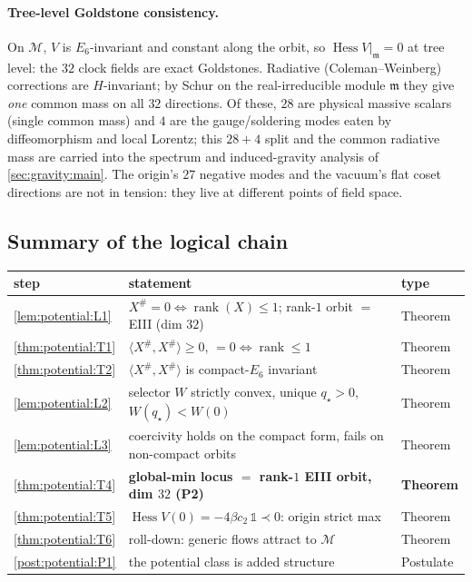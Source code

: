 \documentclass[11pt]{article}
\theoremstyle{plain}
\theoremstyle{definition}
\theoremstyle{remark}
\begin{document}
\paragraph{Tree-level Goldstone consistency.}
On $\mathcal M$, $V$ is $E_6$-invariant and constant along the orbit, so
$\operatorname{Hess}V|_{\mathfrak m}=0$ at tree level: the $32$ clock fields are exact
Goldstones. Radiative (Coleman--Weinberg) corrections are $H$-invariant; by Schur on the
real-irreducible module $\mathfrak m$ they give \emph{one} common mass on all $32$ directions.
Of these, $28$ are physical massive scalars (single common mass) and $4$ are the
gauge/soldering modes eaten by diffeomorphism and local Lorentz; this $28+4$ split and the
common radiative mass are carried into the spectrum and induced-gravity analysis of
\autoref{sec:gravity:main}. The origin's $27$ negative modes and the vacuum's flat coset
directions are not in tension: they live at different points of field space.

\subsection{Summary of the logical chain}
\label{sec:potential:summary}

\begin{center}
\begin{tabular}{lll}
\toprule
step & statement & type \\
\midrule
\autoref{lem:potential:L1} & $X^\#=0\iff\operatorname{rank}(X)\le1$; rank-$1$ orbit $=$ EIII (dim $32$) & Theorem \\
\autoref{thm:potential:T1} & $\langle X^\#,X^\#\rangle\ge0$, $=0\iff\operatorname{rank}\le1$ & Theorem \\
\autoref{thm:potential:T2} & $\langle X^\#,X^\#\rangle$ is compact-$E_6$ invariant & Theorem \\
\autoref{lem:potential:L2} & selector $W$ strictly convex, unique $q_\star>0$, $W(q_\star)<W(0)$ & Theorem \\
\autoref{lem:potential:L3} & coercivity holds on the compact form, fails on non-compact orbits & Theorem \\
\autoref{thm:potential:T4} & \textbf{global-min locus $=$ rank-$1$ EIII orbit, dim $32$ (P2)} & \textbf{Theorem} \\
\autoref{thm:potential:T5} & $\operatorname{Hess}V(0)=-4\beta c_2\,\mathbb1\prec0$: origin strict max & Theorem \\
\autoref{thm:potential:T6} & roll-down: generic flows attract to $\mathcal M$ & Theorem \\
\autoref{post:potential:P1} & the potential class is added structure & Postulate \\
\bottomrule
\end{tabular}
\end{center}
\end{document}
